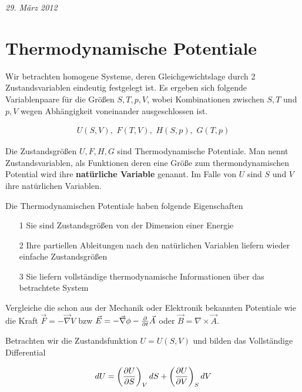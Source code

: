 
\usepackage{amsmath} 





\textit{29. März 2012}


\section*{Thermodynamische Potentiale}

Wir betrachten homogene Systeme, deren Gleichgewichtslage durch 2 Zustandsvariablen eindeutig festgelegt ist. Es ergeben sich folgende Variablenpaare für die Größen \(S,T,p,V\), wobei Kombinationen zwischen \(S,T\) und \(p,V\) wegen Abhängigkeit voneinander ausgeschlossen ist.

\begin{align}
  \label{eq:1}
  U(S,V),\,\, F(T,V),\,\, H(S,p),\,\, G(T,p)
\end{align}

Die Zustandsgrößen \(U,F,H,G\) sind Thermodynamische Potentiale. Man nennt Zustandsvariablen, als Funktionen deren eine Größe zum thermondynamischen Potential wird ihre \textbf{natürliche Variable} genannt. Im Falle von \(U\) sind \(S\) und \(V\) ihre natürlichen Variablen.

Die Thermodynamischen Potentiale haben folgende Eigenschaften

\begin{itemize}
\item[1] Sie sind Zustandsgrößen von der Dimension einer Energie
\item[2] Ihre partiellen Ableitungen nach den natürlichen Variablen liefern wieder einfache Zustandsgrößen
\item[3] Sie liefern vollständige thermodynamische Informationen über das betrachtete System
\end{itemize}

Vergleiche die schon aus der Mechanik oder Elektronik bekannten Potentiale wie die Kraft \(\vec F=-\vec \nabla V\) bzw \(\vec E = -\vec \nabla\phi - \pdiff_t \vec A\) oder \(\vec B = \nabla\times \vec A\).

Betrachten wir die Zustandsfunktion \(U = U(S,V)\) und bilden das Vollständige Differential

\begin{align}
  \label{eq:2}
  dU = \left(\pdiff U_S \right)_V dS +  \left(\pdiff U_V \right)_S dV
\end{align}

